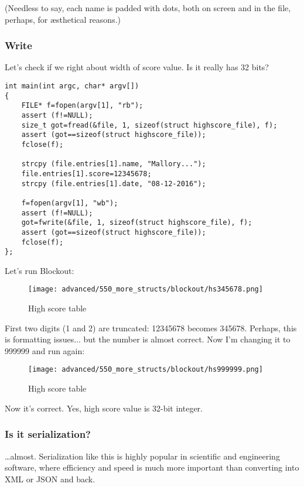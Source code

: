 (Needless to say, each name is padded with dots, both on screen and in the file, perhaps, for \ae{}sthetical reasons.)

\subsubsection{Write}

Let's check if we right about width of score value. Is it really has 32 bits?

\begin{lstlisting}[style=customc]
int main(int argc, char* argv[])
{
	FILE* f=fopen(argv[1], "rb");
	assert (f!=NULL);
	size_t got=fread(&file, 1, sizeof(struct highscore_file), f);
	assert (got==sizeof(struct highscore_file));
	fclose(f);

	strcpy (file.entries[1].name, "Mallory...");
	file.entries[1].score=12345678;
	strcpy (file.entries[1].date, "08-12-2016");

	f=fopen(argv[1], "wb");
	assert (f!=NULL);
	got=fwrite(&file, 1, sizeof(struct highscore_file), f);
	assert (got==sizeof(struct highscore_file));
	fclose(f);
};
\end{lstlisting}

Let's run Blockout:

\begin{figure}[H]
\centering
\texttt{[image: advanced/550\_more\_structs/blockout/hs345678.png]}
\caption{High score table}
\end{figure}

First two digits (1 and 2) are truncated: 12345678 becomes 345678. Perhaps, this is formatting issues... but the number is almost correct.
Now I'm changing it to 999999 and run again:

\begin{figure}[H]
\centering
\texttt{[image: advanced/550\_more\_structs/blockout/hs999999.png]}
\caption{High score table}
\end{figure}

Now it's correct. Yes, high score value is 32-bit integer.

\subsubsection{Is it serialization?}

\dots almost.
Serialization like this is highly popular in scientific and engineering software, where efficiency and speed is much more important
than converting into \ac{XML} or \ac{JSON} and back.

